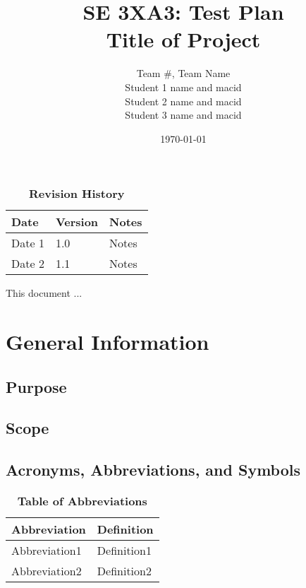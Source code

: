 \documentclass[12pt, titlepage]{article}
\title{SE 3XA3: Test Plan\\Title of Project}
\author{Team \#, Team Name
		\\ Student 1 name and macid
		\\ Student 2 name and macid
		\\ Student 3 name and macid
}
\date{\today}
\begin{document}
\maketitle

\tableofcontents
\listoftables
\listoffigures

\begin{table}[bp]
\caption{\bf Revision History}
\begin{tabularx}{\textwidth}{p{3cm}p{2cm}X}
\toprule {\bf Date} & {\bf Version} & {\bf Notes}\\
\midrule
Date 1 & 1.0 & Notes\\
Date 2 & 1.1 & Notes\\
\bottomrule
\end{tabularx}
\end{table}

\newpage


This document ...

\section{General Information}

\subsection{Purpose}

\subsection{Scope}

\subsection{Acronyms, Abbreviations, and Symbols}
	
\begin{table}[hbp]
\caption{\textbf{Table of Abbreviations}} \label{Table}

\begin{tabularx}{\textwidth}{p{3cm}X}
\toprule
\textbf{Abbreviation} & \textbf{Definition} \\
\midrule
Abbreviation1 & Definition1\\
Abbreviation2 & Definition2\\
\bottomrule
\end{tabularx}

\end{table}
\end{document}
